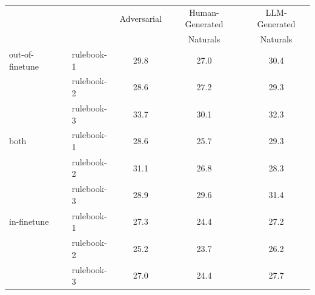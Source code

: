 \begin{tabular}{@{}llccc@{}}
\toprule
 & & Adversarial & Human-Generated & LLM-Generated \\
 & & & Naturals & Naturals \\
\midrule
out-of-finetune & rulebook-1 & 29.8 & 27.0 & 30.4 \\
 & rulebook-2 & 28.6 & 27.2 & 29.3 \\
 & rulebook-3 & 33.7 & 30.1 & 32.3 \\
\midrule
both & rulebook-1 & 28.6 & 25.7 & 29.3 \\
 & rulebook-2 & 31.1 & 26.8 & 28.3 \\
 & rulebook-3 & 28.9 & 29.6 & 31.4 \\
\midrule
in-finetune & rulebook-1 & 27.3 & 24.4 & 27.2 \\
 & rulebook-2 & 25.2 & 23.7 & 26.2 \\
 & rulebook-3 & 27.0 & 24.4 & 27.7 \\
\bottomrule
\end{tabular}
